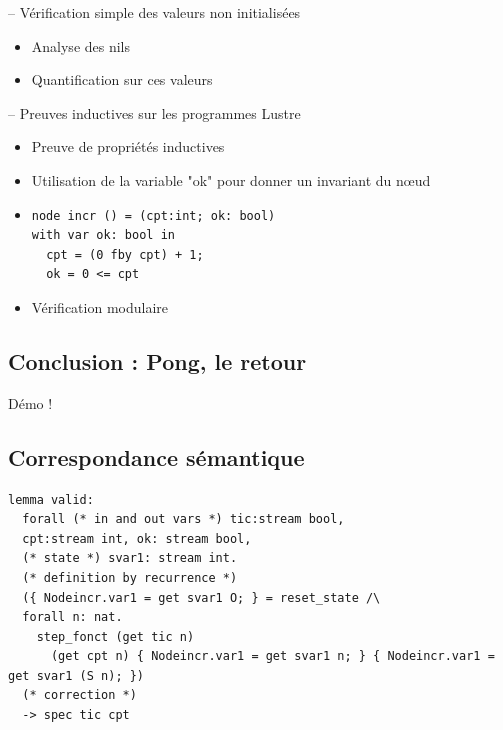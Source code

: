 \documentclass[11pt,usenames,dvipsnames]{beamer}
\begin{document}
\begin{frame}{-- Vérification simple des valeurs non initialisées}
	\begin{itemize}
		\item Analyse des nils
		\item Quantification sur ces valeurs
	\end{itemize}
\end{frame}


\begin{frame}[fragile]{-- Preuves inductives sur les programmes Lustre}
	\begin{itemize}
		\item Preuve de propriétés inductives
		\item Utilisation de la variable "ok" pour donner un invariant du nœud
		\item
		  \begin{lstlisting}[language=minils]
node incr () = (cpt:int; ok: bool)
with var ok: bool in
  cpt = (0 fby cpt) + 1;
  ok = 0 <= cpt\end{lstlisting}
		\item Vérification modulaire
	\end{itemize}
\end{frame}

\subsection{Conclusion : Pong, le retour}
\begin{frame}{\null}
\centering \Large Démo !
\end{frame}



\appendix

\subsection{Correspondance sémantique}
\begin{frame}[fragile]{\null}
  \begin{lstlisting}[language=why3]
lemma valid:
  forall (* in and out vars *) tic:stream bool, 
  cpt:stream int, ok: stream bool,
  (* state *) svar1: stream int.  
  (* definition by recurrence *)
  ({ Nodeincr.var1 = get svar1 O; } = reset_state /\
  forall n: nat.
    step_fonct (get tic n) 
      (get cpt n) { Nodeincr.var1 = get svar1 n; } { Nodeincr.var1 = get svar1 (S n); })
  (* correction *)
  -> spec tic cpt\end{lstlisting}
\end{frame}
\end{document}

